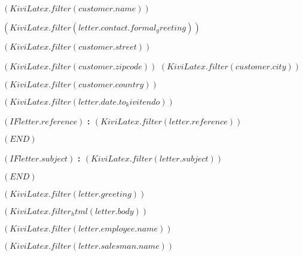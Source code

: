 \documentclass[paper=a4,fontsize=10pt]{scrartcl}
\begin{document}
\fontsize{10pt}{12pt}\selectfont

\vspace*{1cm}

\begin{minipage}{14cm}

  $( KiviLatex.filter(customer.name) )$

  $( KiviLatex.filter(letter.contact.formal_greeting) )$

  $( KiviLatex.filter(customer.street) )$

  $( KiviLatex.filter(customer.zipcode) )$ $( KiviLatex.filter(customer.city) )$

  $( KiviLatex.filter(customer.country) )$

\end{minipage}

\vspace{2.5cm}
\hfill $( KiviLatex.filter(letter.date.to_kivitendo) )$

$( IF letter.reference )$
\textbf{\ihrzeichen : $( KiviLatex.filter(letter.reference) )$}

\vspace{1cm}
$( END )$

$( IF letter.subject )$
\textbf{\betreff : $( KiviLatex.filter(letter.subject) )$}

\vspace{1cm}
$( END )$

$( KiviLatex.filter(letter.greeting) )$

\vspace{0.5cm}

$( KiviLatex.filter_html(letter.body) )$

\vspace{0.5cm}

\begin{minipage}{6cm}

\textbf{$( KiviLatex.filter(letter.employee.name) )$}

\end{minipage}
\begin{minipage}{6cm}

\textbf{$( KiviLatex.filter(letter.salesman.name) )$}

\end{minipage}
\end{document}
